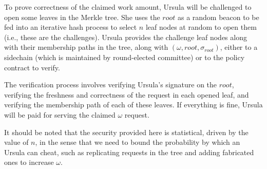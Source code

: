 To prove correctness of the claimed work amount, Ursula will be challenged to open some leaves in the Merkle tree. She uses the $root$ as a random beacon to be fed into an iterative hash process to select $n$ leaf nodes at random to open them (i.e., these are the challenges). Ursula provides the challenge leaf nodes along with their membership paths in the tree, along with $(\omega, root, \sigma_{root})$, either to a sidechain (which is maintained by round-elected committee) or to the policy contract to verify. 


The verification process involves verifying Ursula's signature on the $root$, verifying the freshness and correctness of the request in each opened leaf, and verifying the membership path of each of these leaves. If everything is fine, Ursula will be paid for serving the claimed $\omega$ request.


It should be noted that the security provided here is statistical, driven by the value of $n$, in the sense that we need to bound the probability by which an Ursula can cheat, such as replicating requests in the tree and adding fabricated ones to increase $\omega$. 